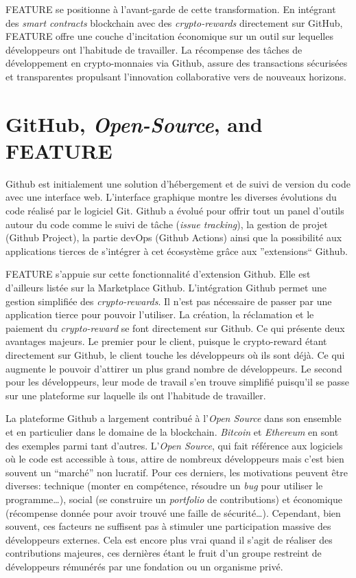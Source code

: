 \documentclass[
	a4paper, %
	10pt, %
	unnumberedsections, %
	twoside, %
]{LTJournalArticle}
\begin{document}
FEATURE se positionne à l'avant-garde de cette transformation. En intégrant des \emph{smart contracts} blockchain avec des \emph{crypto-rewards} directement sur GitHub, FEATURE offre une couche d'incitation économique sur un outil sur lequelles développeurs ont l'habitude de travailler. La récompense des tâches de développement en crypto-monnaies via Github, assure des transactions sécurisées et transparentes propulsant l'innovation collaborative vers de nouveaux horizons.


\section{GitHub, \emph{Open-Source}, and FEATURE}

Github est initialement une solution d'hébergement et de suivi de version du code avec une interface web. L'interface graphique montre les diverses évolutions du code réalisé par le logiciel Git. Github a évolué pour offrir tout un panel d'outils autour du code comme le suivi de tâche (\emph{issue tracking}), la gestion de projet (Github Project), la partie devOps (Github Actions) ainsi que la possibilité aux applications tierces de s'intégrer à cet écosystème grâce aux ''extensions`` Github.

FEATURE s'appuie sur cette fonctionnalité d'extension Github. Elle est d'ailleurs listée sur la Marketplace Github. L'intégration Github permet une gestion simplifiée des \emph{crypto-rewards}. Il n'est pas nécessaire de passer par une application tierce pour pouvoir l'utiliser. La création, la réclamation et le paiement du \emph{crypto-reward} se font directement sur Github. Ce qui présente deux avantages majeurs. Le premier pour le client, puisque le crypto-reward étant directement sur Github, le client touche les développeurs où ils sont déjà. Ce qui augmente le pouvoir d'attirer un plus grand nombre de développeurs. Le second pour les développeurs, leur mode de travail s'en trouve simplifié puisqu'il se passe sur une plateforme sur laquelle ils ont l'habitude de travailler.

La plateforme Github a largement contribué à l'\emph{Open Source} dans son ensemble et en particulier dans le domaine de la blockchain. \emph{Bitcoin} et \emph{Ethereum} en sont des exemples parmi tant d'autres. L'\emph{Open Source}, qui fait référence aux logiciels où le code est accessible à tous, attire de nombreux développeurs mais c'est bien souvent un ``marché'' non lucratif. Pour ces derniers, les motivations peuvent être diverses: technique (monter en compétence, résoudre un \emph{bug} pour utiliser le programme\ldots), social (se construire un \emph{portfolio} de contributions) et économique (récompense donnée pour avoir trouvé une faille de sécurité\ldots). Cependant, bien souvent, ces facteurs ne suffisent pas à stimuler une participation massive des développeurs externes. Cela est encore plus vrai quand il s'agit de réaliser des contributions majeures, ces dernières étant le fruit d'un groupe restreint de développeurs rémunérés par une fondation
ou un organisme privé.
\end{document}
